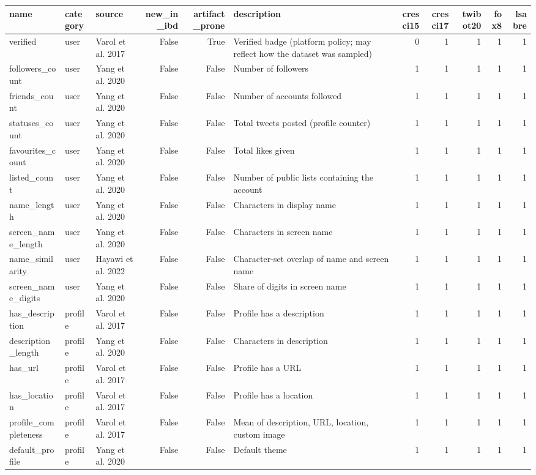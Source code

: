 \begin{tabular}{lllrrlrrrrr}
\toprule
name & category & source & new_in_ibd & artifact_prone & description & cresci15 & cresci17 & twibot20 & fox8 & lsabre \\
\midrule
verified & user & Varol et al. 2017 & False & True & Verified badge (platform policy; may reflect how the dataset was sampled) & 0 & 1 & 1 & 1 & 1 \\
followers_count & user & Yang et al. 2020 & False & False & Number of followers & 1 & 1 & 1 & 1 & 1 \\
friends_count & user & Yang et al. 2020 & False & False & Number of accounts followed & 1 & 1 & 1 & 1 & 1 \\
statuses_count & user & Yang et al. 2020 & False & False & Total tweets posted (profile counter) & 1 & 1 & 1 & 1 & 1 \\
favourites_count & user & Yang et al. 2020 & False & False & Total likes given & 1 & 1 & 1 & 1 & 1 \\
listed_count & user & Yang et al. 2020 & False & False & Number of public lists containing the account & 1 & 1 & 1 & 1 & 1 \\
name_length & user & Yang et al. 2020 & False & False & Characters in display name & 1 & 1 & 1 & 1 & 1 \\
screen_name_length & user & Yang et al. 2020 & False & False & Characters in screen name & 1 & 1 & 1 & 1 & 1 \\
name_similarity & user & Hayawi et al. 2022 & False & False & Character-set overlap of name and screen name & 1 & 1 & 1 & 1 & 1 \\
screen_name_digits & user & Yang et al. 2020 & False & False & Share of digits in screen name & 1 & 1 & 1 & 1 & 1 \\
has_description & profile & Varol et al. 2017 & False & False & Profile has a description & 1 & 1 & 1 & 1 & 1 \\
description_length & profile & Yang et al. 2020 & False & False & Characters in description & 1 & 1 & 1 & 1 & 1 \\
has_url & profile & Varol et al. 2017 & False & False & Profile has a URL & 1 & 1 & 1 & 1 & 1 \\
has_location & profile & Varol et al. 2017 & False & False & Profile has a location & 1 & 1 & 1 & 1 & 1 \\
profile_completeness & profile & Varol et al. 2017 & False & False & Mean of description, URL, location, custom image & 1 & 1 & 1 & 1 & 1 \\
default_profile & profile & Yang et al. 2020 & False & False & Default theme & 1 & 1 & 1 & 1 & 1 \\

\end{tabular}
